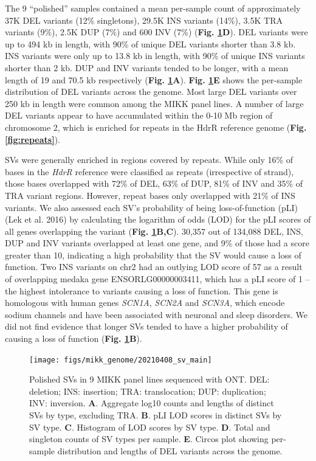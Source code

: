 \documentclass[
]{book}
\begin{document}
The 9 ``polished'' samples contained a mean per-sample count of approximately 37K DEL variants (12\% singletons), 29.5K INS variants (14\%), 3.5K TRA variants (9\%), 2.5K DUP (7\%) and 600 INV (7\%) (\textbf{Fig. \ref{fig:SV-main}D}). DEL variants were up to 494 kb in length, with 90\% of unique DEL variants shorter than 3.8 kb. INS variants were only up to 13.8 kb in length, with 90\% of unique INS variants shorter than 2 kb. DUP and INV variants tended to be longer, with a mean length of 19 and 70.5 kb respectively (\textbf{Fig. \ref{fig:SV-main}A}). \textbf{Fig. \ref{fig:SV-main}E} shows the per-sample distribution of DEL variants across the genome. Most large DEL variants over 250 kb in length were common among the MIKK panel lines. A number of large DEL variants appear to have accumulated within the 0-10 Mb region of chromosome 2, which is enriched for repeats in the HdrR reference genome (\textbf{Fig. \ref{fig:repeats}}).

SVs were generally enriched in regions covered by repeats. While only 16\% of bases in the \emph{HdrR} reference were classified as repeats (irrespective of strand), those bases overlapped with 72\% of DEL, 63\% of DUP, 81\% of INV and 35\% of TRA variant regions. However, repeat bases only overlapped with 21\% of INS variants. We also assessed each SV's probability of being loss-of-function (pLI)(Lek et al. 2016) by calculating the logarithm of odds (LOD) for the pLI scores of all genes overlapping the variant (\textbf{Fig. \ref{fig:SV-main}B,C}). 30,357 out of 134,088 DEL, INS, DUP and INV variants overlapped at least one gene, and 9\% of those had a score greater than 10, indicating a high probability that the SV would cause a loss of function. Two INS variants on chr2 had an outlying LOD score of 57 as a result of overlapping medaka gene ENSORLG00000003411, which has a pLI score of 1 -- the highest intolerance to variants causing a loss of function. This gene is homologous with human genes \emph{SCN1A}, \emph{SCN2A} and \emph{SCN3A}, which encode sodium channels and have been associated with neuronal and sleep disorders. We did not find evidence that longer SVs tended to have a higher probability of causing a loss of function (\textbf{Fig. \ref{fig:SV-main}B}).



\begin{figure}
\texttt{[image: figs/mikk\_genome/20210408\_sv\_main]} \caption{Polished SVs in 9 MIKK panel lines sequenced with ONT. DEL: deletion; INS: insertion; TRA: translocation; DUP: duplication; INV: inversion. \textbf{A}. Aggregate log10 counts and lengths of distinct SVs by type, excluding TRA. \textbf{B}. pLI LOD scores in distinct SVs by SV type. \textbf{C}. Histogram of LOD scores by SV type. \textbf{D}. Total and singleton counts of SV types per sample. \textbf{E}. Circos plot showing per-sample distribution and lengths of DEL variants across the genome.}\label{fig:SV-main}
\end{figure}
\end{document}
